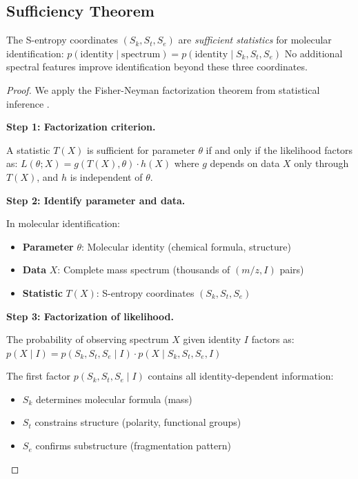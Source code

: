 \subsection{Sufficiency Theorem}

\begin{theorem}
\label{thm:sufficient}
The S-entropy coordinates $(S_k, S_t, S_e)$ are \emph{sufficient statistics} for molecular identification:
$
p(\text{identity} \mid \text{spectrum}) = p(\text{identity} \mid S_k, S_t, S_e)
$
No additional spectral features improve identification beyond these three coordinates.
\end{theorem}

\begin{proof}
We apply the Fisher-Neyman factorization theorem from statistical inference \citep{cover2006elements}.

\textbf{Step 1: Factorization criterion.}

A statistic $T(X)$ is sufficient for parameter $\theta$ if and only if the likelihood factors as:
$
L(\theta; X) = g(T(X), \theta) \cdot h(X)
$
where $g$ depends on data $X$ only through $T(X)$, and $h$ is independent of $\theta$.

\textbf{Step 2: Identify parameter and data.}

In molecular identification:
\begin{itemize}
    \item \textbf{Parameter} $\theta$: Molecular identity (chemical formula, structure)
    \item \textbf{Data} $X$: Complete mass spectrum (thousands of $(m/z, I)$ pairs)
    \item \textbf{Statistic} $T(X)$: S-entropy coordinates $(S_k, S_t, S_e)$
\end{itemize}

\textbf{Step 3: Factorization of likelihood.}

The probability of observing spectrum $X$ given identity $I$ factors as:
$
p(X \mid I) = p(S_k, S_t, S_e \mid I) \cdot p(X \mid S_k, S_t, S_e, I)
$

The first factor $p(S_k, S_t, S_e \mid I)$ contains all identity-dependent information:
\begin{itemize}
    \item $S_k$ determines molecular formula (mass)
    \item $S_t$ constrains structure (polarity, functional groups)
    \item $S_e$ confirms substructure (fragmentation pattern)
\end{itemize}


\end{proof}
